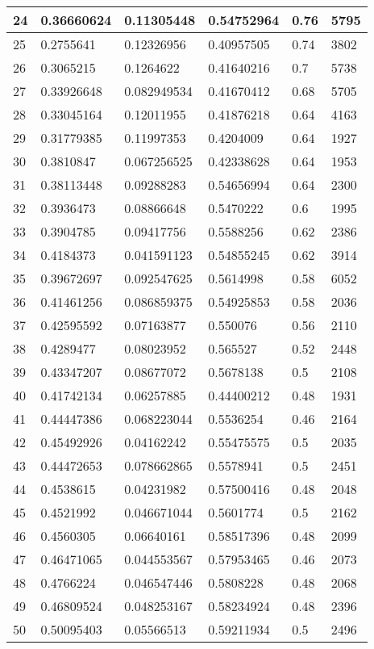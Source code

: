 \begin{longtable}{|l|l|l|l|l|l|}
24 & 0.36660624 & 0.11305448 & 0.54752964 & 0.76 & 5795 \\ \hline 
25 & 0.2755641 & 0.12326956 & 0.40957505 & 0.74 & 3802 \\ \hline 
26 & 0.3065215 & 0.1264622 & 0.41640216 & 0.7 & 5738 \\ \hline 
27 & 0.33926648 & 0.082949534 & 0.41670412 & 0.68 & 5705 \\ \hline 
28 & 0.33045164 & 0.12011955 & 0.41876218 & 0.64 & 4163 \\ \hline 
29 & 0.31779385 & 0.11997353 & 0.4204009 & 0.64 & 1927 \\ \hline 
30 & 0.3810847 & 0.067256525 & 0.42338628 & 0.64 & 1953 \\ \hline 
31 & 0.38113448 & 0.09288283 & 0.54656994 & 0.64 & 2300 \\ \hline 
32 & 0.3936473 & 0.08866648 & 0.5470222 & 0.6 & 1995 \\ \hline 
33 & 0.3904785 & 0.09417756 & 0.5588256 & 0.62 & 2386 \\ \hline 
34 & 0.4184373 & 0.041591123 & 0.54855245 & 0.62 & 3914 \\ \hline 
35 & 0.39672697 & 0.092547625 & 0.5614998 & 0.58 & 6052 \\ \hline 
36 & 0.41461256 & 0.086859375 & 0.54925853 & 0.58 & 2036 \\ \hline 
37 & 0.42595592 & 0.07163877 & 0.550076 & 0.56 & 2110 \\ \hline 
38 & 0.4289477 & 0.08023952 & 0.565527 & 0.52 & 2448 \\ \hline 
39 & 0.43347207 & 0.08677072 & 0.5678138 & 0.5 & 2108 \\ \hline 
40 & 0.41742134 & 0.06257885 & 0.44400212 & 0.48 & 1931 \\ \hline 
41 & 0.44447386 & 0.068223044 & 0.5536254 & 0.46 & 2164 \\ \hline 
42 & 0.45492926 & 0.04162242 & 0.55475575 & 0.5 & 2035 \\ \hline 
43 & 0.44472653 & 0.078662865 & 0.5578941 & 0.5 & 2451 \\ \hline 
44 & 0.4538615 & 0.04231982 & 0.57500416 & 0.48 & 2048 \\ \hline 
45 & 0.4521992 & 0.046671044 & 0.5601774 & 0.5 & 2162 \\ \hline 
46 & 0.4560305 & 0.06640161 & 0.58517396 & 0.48 & 2099 \\ \hline 
47 & 0.46471065 & 0.044553567 & 0.57953465 & 0.46 & 2073 \\ \hline 
48 & 0.4766224 & 0.046547446 & 0.5808228 & 0.48 & 2068 \\ \hline 
49 & 0.46809524 & 0.048253167 & 0.58234924 & 0.48 & 2396 \\ \hline 
50 & 0.50095403 & 0.05566513 & 0.59211934 & 0.5 & 2496 \\ \hline 
\end{longtable}